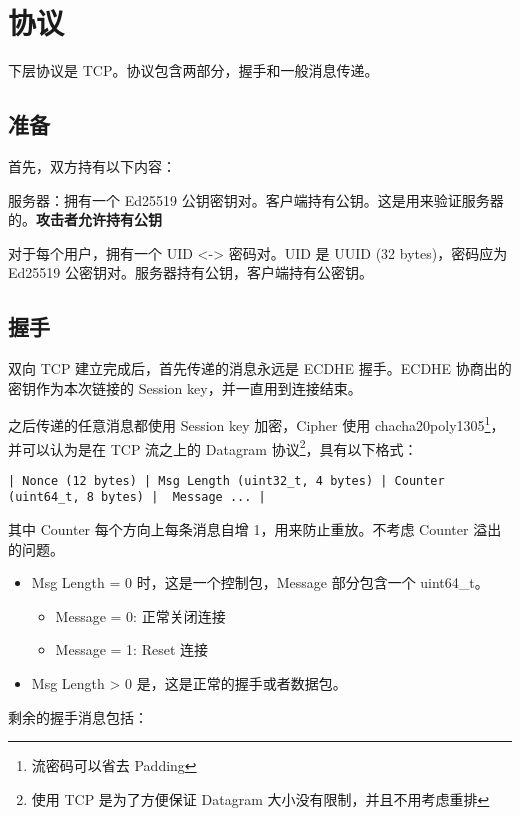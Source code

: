 \documentclass{ctexart}
\begin{document}
  \section{协议}

  下层协议是 TCP。协议包含两部分，握手和一般消息传递。

  \subsection{准备}

  首先，双方持有以下内容：
  
  服务器：拥有一个 Ed25519 公钥密钥对。客户端持有公钥。这是用来验证服务器的。\textbf{攻击者允许持有公钥}

  对于每个用户，拥有一个 UID <-> 密码对。UID 是 UUID (32 bytes)，密码应为 Ed25519 公密钥对。服务器持有公钥，客户端持有公密钥。

  \subsection{握手}

  双向 TCP 建立完成后，首先传递的消息永远是 ECDHE 握手。ECDHE 协商出的密钥作为本次链接的 Session key，并一直用到连接结束。
  
  之后传递的任意消息都使用 Session key 加密，Cipher 使用 chacha20poly1305\footnote{流密码可以省去 Padding}，并可以认为是在 TCP 流之上的 Datagram 协议\footnote{使用 TCP 是为了方便保证 Datagram 大小没有限制，并且不用考虑重排}，具有以下格式：

  \begin{verbatim}
| Nonce (12 bytes) | Msg Length (uint32_t, 4 bytes) | Counter (uint64_t, 8 bytes) |  Message ... |
  \end{verbatim}

  其中 Counter 每个方向上每条消息自增 1，用来防止重放。不考虑 Counter 溢出的问题。
  \begin{itemize}
    \item Msg Length = 0 时，这是一个控制包，Message 部分包含一个 uint64\_t。
    \begin{itemize}
      \item Message = 0: 正常关闭连接
      \item Message = 1: Reset 连接
    \end{itemize}
    \item Msg Length > 0 是，这是正常的握手或者数据包。
  \end{itemize} 

  剩余的握手消息包括：
\end{document}
